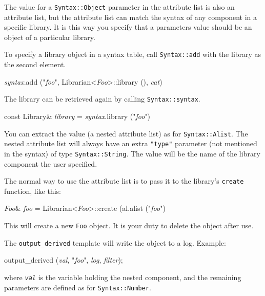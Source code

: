 \documentclass{article}
\newcommand{\code}[1]{\texttt{#1}}
\begin{document}
The value for a \code{Syntax::Object} parameter in the attribute list
is also an attribute list, but the attribute list can match the syntax
of any component in a specific library.  It is this way you specify
that a parameters value should be an object of a particular library.

To specify a library object in a syntax table, call
\code{Syntax::add} with the library as the second element.
\begin{center}
  \begin{tt}
    \textit{syntax}.add ("\textit{foo}", 
                         Librarian<\textit{Foo}>::library (),
                         \textit{cat})
  \end{tt}
\end{center}
The library can be retrieved again
by calling \code{Syntax::syntax}.
\begin{center}
  \begin{tt}
    const Library\& \textit{library}
      = \textit{syntax}.library ("\textit{foo}")
  \end{tt}
\end{center}

You can extract the value (a nested attribute list) as for
\code{Syntax::Alist}.  The nested attribute list will always have an
extra \code{"type"} parameter (not mentioned in the syntax) of type
\code{Syntax::String}.  The value will be the name of the library
component the user specified.

The normal way to use the attribute list is to pass it to the
library's \code{create} function, like this:
\begin{center}
  \begin{tt}
    \textit{Foo}\& \textit{foo}
      = Librarian<\textit{Foo}>::create (al.alist ("\textit{foo}")
  \end{tt}
\end{center}
This will create a new \code{Foo} object.  It is your duty to delete
the object after use.

The \code{output\_derived} template will write the object to a log.
Example: 
\begin{center}
  \begin{tt}
    output\_derived (\textit{val}, "\textit{foo}", 
                     \textit{log}, \textit{filter});
  \end{tt}
\end{center}
where \texttt{\textit{val}} is the variable holding the nested
component, and the remaining parameters are defined as for
\texttt{Syntax::Number}. 
\end{document}
